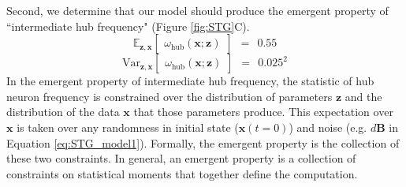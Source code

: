 \documentclass[11pt]{article}
\begin{document}
Second, we determine that our model should produce the emergent property of ``intermediate hub frequency" (Figure \ref{fig:STG}C).
\begin{equation}\label{eq:EP_STG1}
 \mathbb{E}_{\mathbf{z},\mathbf{x}}\begin{bmatrix} \omega_{\text{hub}}(\mathbf{x}; \mathbf{z}) \end{bmatrix}  ~~=~~  0.55
\end{equation}
\begin{equation}\label{eq:EP_STG2}
\text{Var}_{\mathbf{z},\mathbf{x}}\begin{bmatrix} \omega_{\text{hub}}(\mathbf{x}; \mathbf{z}) \end{bmatrix}  ~~=~~   0.025^2
\end{equation}
In the emergent property of intermediate hub frequency, the statistic of hub neuron frequency is constrained over the distribution of parameters $\mathbf{z}$ and the distribution of the data $\mathbf{x}$ that those parameters produce.
This expectation over $\mathbf{x}$ is taken over any randomness in initial state ($\mathbf{x}(t = 0)$) and noise (e.g. $d\mathbf{B}$ in Equation \ref{eq:STG_model1}).
Formally, the emergent property is the collection of these two constraints.
In general, an emergent property is a collection of constraints on statistical moments that together define the computation.
\end{document}
